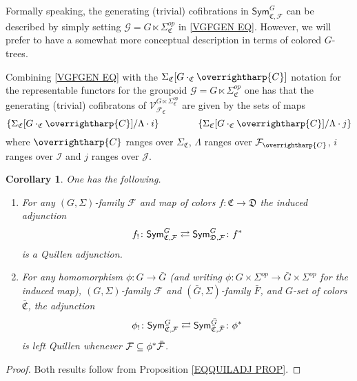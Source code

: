 \documentclass[a4paper,10pt
,draft
]{article}%
\numberwithin{equation}{section}
\numberwithin{figure}{section}
\newtheorem{corollary}[equation]{Corollary}%
\theoremstyle{definition} %
\newtheorem{remark}[equation]{Remark}%
\newcommand{\vect}[1]{\text{\overrightharp{\ensuremath{#1}}}}
\newcommand{\F}{\ensuremath{\mathcal F}}
\newcommand{\V}{\ensuremath{\mathcal V}}
\newcommand{\G}{\ensuremath{\mathcal G}}
\newcommand{\1}{\ensuremath{\mathbbm 1}}%
\begin{document}
Formally speaking, the generating (trivial) cofibrations in 
$\mathsf{Sym}^G_{\mathfrak{C},\mathcal{F}}$
can be described by simply setting 
$\G = G \ltimes \Sigma^{op}_{\mathfrak{C}}$ in \eqref{VGFGEN EQ}.
However, we will prefer to have a somewhat more conceptual description in terms of colored $G$-trees.








Combining \eqref{VGFGEN EQ} with the 
$\Sigma_{\mathfrak{C}}[G \cdot_{\mathfrak{C}} \vect{C}]$ notation
for the representable functors for the groupoid
$\G = G \ltimes \Sigma^{op}_{\mathfrak{C}}$
one has that the generating (trivial) cofibratons of
$\V^{G \ltimes \Sigma_{\mathfrak{C}}^{op}}_{\F_{\mathfrak{C}}}$
are given by the sets of maps
\begin{equation}\label{VGSIGF EQ}
	\left\{
	\Sigma_{\mathfrak{C}}[G \cdot_{\mathfrak{C}} \vect{C}]/\Lambda \cdot i
	\right\}
\qquad \qquad
	\left\{
	\Sigma_{\mathfrak{C}}[G \cdot_{\mathfrak{C}} \vect{C}]/\Lambda \cdot j
	\right\}
\end{equation}
where $\vect{C}$ ranges over $\Sigma_{\mathfrak{C}}$,
$\Lambda$ ranges over $\F_{\vect{C}}$,
$i$ ranges over $\mathcal{I}$ and
$j$ ranges over $\mathcal{J}$.




\begin{corollary}\label{SYMADJ_COR}
One has the following.
      \begin{enumerate}[label=(\roman*)]
      \item \label{SYMCOCHADJ_LBL}
            For any $(G,\Sigma)$-family $\F$ and map of colors $f \colon \mathfrak{C} \to \mathfrak{D}$
            the induced adjunction
            \[
                  f_! \colon \mathsf{Sym}^G_{\mathfrak{C},\F}
                  \rightleftarrows
                  \mathsf{Sym}^G_{\mathfrak{D},\F} \colon f^{\**}
            \]
            is a Quillen adjunction.
      \item \label{FIXSETCHGR_LBL}
            For any homomorphism $\phi \colon G \to \bar G$ (and writing $\phi \colon G \times \Sigma^{op} \to \bar G \times \Sigma^{op}$ for the induced map),
            $(G,\Sigma)$-family $\F$ and $(\bar G,\Sigma)$-family $\bar F$,
            and $G$-set of colors $\bar{\mathfrak C}$,
            the adjunction
            \[
                  \phi_! \colon \mathsf{Sym}^G_{\bar{\mathfrak{C}},\F}
                  \rightleftarrows
                  \mathsf{Sym}^{\bar{G}}_{\bar{\mathfrak{C}},\bar{\F}} \colon \phi^{\**}
            \]
            is left Quillen whenever $\F \subseteq \phi^{\**} \bar{\F}$.
      \end{enumerate}
\end{corollary}
\begin{proof}
      Both results follow from Proposition \ref{EQQUILADJ PROP}.
\end{proof}
\end{document}
